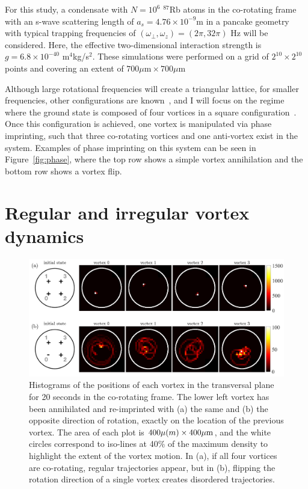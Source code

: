 For this study, a condensate with $N = 10^6$ $^{87}$Rb atoms in the co-rotating frame with an s-wave scattering length of $a_s=4.76\times 10^{-9}$m in a pancake geometry with typical trapping frequencies of $(\omega_\perp, \omega_z) = (2\pi, 32\pi)$ Hz will be considered.
Here, the effective two-dimensional interaction strength is $g = 6.8\times 10^{-40}$ m$^4$kg/s$^2$.
These simulations were performed on a grid of $2^{10} \times 2^{10}$ points and covering an extent of $700\mu \text{m} \times 700 \mu \text{m}$

Although large rotational frequencies will create a triangular lattice, for smaller frequencies, other configurations are known~\cite{aftalion2001}, and I will focus on the regime where the ground state is composed of four vortices in a square configuration~\cite{zampetaki2013}.
Once this configuration is achieved, one vortex is manipulated via phase imprinting, such that three co-rotating vortices and one anti-vortex exist in the system.
Examples of phase imprinting on this system can be seen in Figure~\ref{fig:phase}, where the top row shows a simple vortex annihilation and the bottom row shows a vortex flip.

\section{Regular and irregular vortex dynamics}

\begin{figure}
\includegraphics[width=\textwidth]{data/2d/histogram/histogram}

\caption{
Histograms of the positions of each vortex in the transversal plane for 20 seconds in the co-rotating frame.
The lower left vortex has been annihilated and re-imprinted with (a) the same and (b) the opposite direction of rotation, exactly on the location of the previous vortex.
The area of each plot is $400\mu \text(m) \times 400 \mu \text{m}$, and the white circles correspond to iso-lines at 40\% of the maximum density to highlight the extent of the vortex motion.
In (a), if all four vortices are co-rotating, regular trajectories appear, but in (b), flipping the rotation direction of a single vortex creates disordered trajectories.
}
\label{fig:histogram}
\end{figure}

